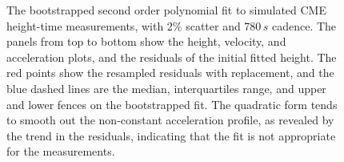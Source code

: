 \documentclass[structabstract]{aa}
\begin{document}
\begin{figure}[!ht]
\centering
{}
\caption{The bootstrapped second order polynomial fit to simulated CME height-time measurements, with 2\% scatter and 780$\,s$ cadence. The panels from top to bottom show the height, velocity, and acceleration plots, and the residuals of the initial fitted height. The red points show the resampled residuals with replacement, and the blue dashed lines are the median, interquartiles range, and upper and lower fences on the bootstrapped fit. The quadratic form tends to smooth out the non-constant acceleration profile, as revealed by the trend in the residuals, indicating that the fit is not appropriate for the measurements.}
\label{fig_quadratic}
\end{figure}
\end{document}
